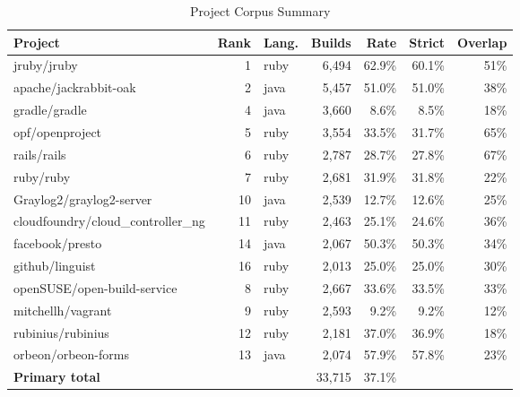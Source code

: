 \begin{table}[htbp]
\centering
\scriptsize\setlength{\tabcolsep}{2pt}
\caption{Project Corpus Summary}
\label{tab:corpus}
\begin{tabular}{p{1.55cm}rlrrrr}
\toprule
Project & Rank & Lang. & Builds & Rate & Strict & Overlap \\
\midrule
jruby/\allowbreak jruby & 1 & ruby & 6{,}494 & 62.9\% & 60.1\% & 51\% \\
apache/\allowbreak jackrabbit-oak & 2 & java & 5{,}457 & 51.0\% & 51.0\% & 38\% \\
gradle/\allowbreak gradle & 4 & java & 3{,}660 & 8.6\% & 8.5\% & 18\% \\
opf/\allowbreak openproject & 5 & ruby & 3{,}554 & 33.5\% & 31.7\% & 65\% \\
rails/\allowbreak rails & 6 & ruby & 2{,}787 & 28.7\% & 27.8\% & 67\% \\
ruby/\allowbreak ruby & 7 & ruby & 2{,}681 & 31.9\% & 31.8\% & 22\% \\
Graylog2/\allowbreak graylog2-server & 10 & java & 2{,}539 & 12.7\% & 12.6\% & 25\% \\
cloudfoundry/\allowbreak cloud\allowbreak\_controller\allowbreak\_ng & 11 & ruby & 2{,}463 & 25.1\% & 24.6\% & 36\% \\
facebook/\allowbreak presto & 14 & java & 2{,}067 & 50.3\% & 50.3\% & 34\% \\
github/\allowbreak linguist & 16 & ruby & 2{,}013 & 25.0\% & 25.0\% & 30\% \\
\midrule
openSUSE/\allowbreak open-build-service & 8 & ruby & 2{,}667 & 33.6\% & 33.5\% & 33\% \\
mitchellh/\allowbreak vagrant & 9 & ruby & 2{,}593 & 9.2\% & 9.2\% & 12\% \\
rubinius/\allowbreak rubinius & 12 & ruby & 2{,}181 & 37.0\% & 36.9\% & 18\% \\
orbeon/\allowbreak orbeon-forms & 13 & java & 2{,}074 & 57.9\% & 57.8\% & 23\% \\
\midrule
\textbf{Primary total} & & & 33{,}715 & 37.1\% & & \\
\bottomrule
\end{tabular}
\end{table}
